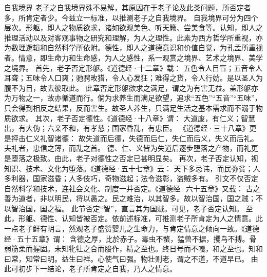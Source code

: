 \documentclass[11pt]{article}
\begin{document}
  自我境界
  老子之自我境界殊不易解，其原因在于老子论及此类问题，所否定者多，所肯定者少。今兹立一标准，以推测老子之自我境界。
  自我境界可分为四个层次。形躯，即人之物质欲求，诸如欲观美色、听天籁、尝美食等。认知，即人之推理活动以及对客观事物之研究和理解，为人之理性。此素为西方哲学所重视，亦为数理逻辑和自然科学所依附。德性，即人之道德意识和价值自觉，为孔孟所重视者。情意，即生命力和生命感，为人之感性，系一观赏之境界、艺术之境界、美学之境界。
  首先，老子否定形躯。《道德经·十二章》载：
  五色令人目盲；五音令人耳聋；五味令人口爽；驰骋畋猎，令人心发狂；难得之货，令人行妨。是以圣人为腹不为目，故去彼取此。
  此章否定形躯欲求之满足，谓之为有害无益。盖形躯亦为万物之一，故亦循道而行。倘为求养生而满足欲望，追求“五色”“五音”“五味”，只会得到相反之结果，反而害生。故圣人养生，只满足生活之基本需求而不溺于物质欲求。
  其次，老子否定德性。《道德经·十八章》谓：
  大道废，有仁义；智慧出，有大伪；六亲不和，有孝慈；国家昏乱，有忠臣。
  《道德经·三十八章》更是抨击仁义礼智诸德：
  故失道而后德，失德而后仁，失仁而后义，失义而后礼。夫礼者，忠信之薄，而乱之首。
  德、仁、义皆为失道后逐步堕落之产物，而礼更是堕落之极致。由此，老子对德性之否定已甚明显矣。
  再次，老子否定认知，视知识、技术、文化为堕落。《道德经·五十七章》云：
  天下多忌讳，而民弥贫；人多利器，国家滋昏；人多伎巧，奇物滋起；法令滋彰，盗贼多有。
  引文不仅否定自然科学和技术，连社会文化、制度一并否定。《道德经·六十五章》又载：
  古之善为道者，非以明民，将以愚之。民之难治，以其智多。故以智治国，国之贼；不以智治国，国之福。
  此节否定“智”，直言其为国贼。可见，老子否定认知。
  至此，形躯、德性、认知皆被否定。依前述标准，可推测老子所肯定为人之情意。此一点老子鲜有明言，然观老子盛赞婴儿之生命力，与肯定情意之倾向一致。《道德经·五十五章》谓：
  含德之厚，比於赤子。毒虫不螫，猛兽不据，攫鸟不搏。骨弱筋柔而握固。未知牝牡之合而朘作，精之至也。终日号而不嘎，和之至也。知和曰常，知常曰明。益生曰祥。心使气曰强。物壮则老，谓之不道，不道早已。
  由此可初步下一结论，老子所肯定之自我，乃人之情意。
\end{document}
